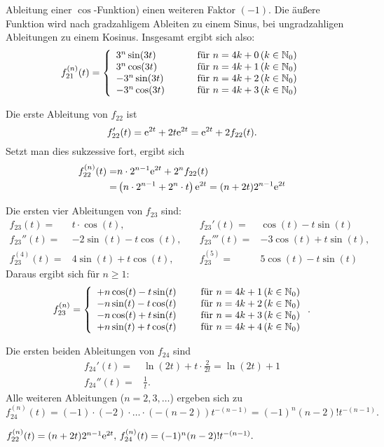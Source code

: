 {\begin{iii}
Ableitung einer $\cos$-Funktion) einen weiteren Faktor $(-1)$. Die \"außere Funktion wird nach gradzahligem
Ableiten zu einem Sinus, bei ungradzahligen Ableitungen zu einem Kosinus. Insgesamt ergibt sich
also: 
$$f_{21}^{(n)}(t)=\left\{\begin{array}{lll}
3^n \sin(3t)&\quad&\text{ f\"ur } n=4k+0\, (k\in\mathbb{N}_0)\\
3^n \cos(3t)&\quad&\text{ f\"ur } n=4k+1\, (k\in\mathbb{N}_0)\\
-3^n \sin(3t)&\quad&\text{ f\"ur } n=4k+2\, (k\in\mathbb{N}_0)\\
-3^n \cos(3t)&\quad&\text{ f\"ur } n=4k+3\, (k\in\mathbb{N}_0)
\end{array}\right.$$
\item Die erste Ableitung von $f_{22}$ ist
$$f_{22}'(t)=\mathrm{e}^{2t}+2t\mathrm{e}^{2t}=\mathrm{e}^{2t} + 2 f_{22}(t).$$
Setzt man dies sukzessive fort, ergibt sich
\begin{align*}
f_{22}^{(n)}(t)=&n\cdot 2^{n-1} \mathrm{e}^{2t} + 2^n f_{22}(t)\\
=&\left( n\cdot 2^{n-1} + 2^n\cdot t\right)\mathrm{e}^{2t}=(n+2t)2^{n-1}\mathrm{e}^{2t}
\end{align*}
\item Die ersten vier Ableitungen von $f_{23}$ sind: 
\begin{align*}
f_{23}(t)=&
t\cdot \cos(t),\quad&f_{23}'(t)=&\cos(t)-t\sin(t)\\
f_{23}''(t)=&-2\sin(t)-t\cos(t),\quad&f_{23}'''(t)=&-3\cos(t)+t\sin(t),\\
f_{23}^{(4)}(t)=&4\sin(t)+t\cos(t),\quad&f_{23}^{(5)} =& 5\cos(t)-t\sin(t)
\end{align*}
Daraus ergibt sich f\"ur $n\geq 1$:
$$f_{23}^{(n)} = \left\{\begin{array}{lll}
+n\cos(t)-t\sin(t) &\, & \text{ f\"ur } n=4k+1\, (k\in\mathbb{N}_0)\\
-n\sin(t)-t\cos(t) &\, & \text{ f\"ur } n=4k+2\, (k\in\mathbb{N}_0)\\
-n\cos(t)+t\sin(t) &\, & \text{ f\"ur } n=4k+3\, (k\in\mathbb{N}_0)\\
+n\sin(t)+t\cos(t) &\, & \text{ f\"ur } n=4k+4\, (k\in\mathbb{N}_0)
\end{array}\right..
$$
\item Die ersten beiden Ableitungen von $f_{24}$ sind
\begin{align*}
f_{24}'(t)=& \ln (2t) + t\cdot \frac 2{2t} = \ln (2t)+1\\
f_{24}''(t)=& \frac 1 t .
\end{align*}
Alle weiteren Ableitungen ($n=2,3,\hdots$) ergeben sich zu 
$$f_{24}^{(n)}(t)=(-1)\cdot(-2)\cdot \hdots\cdot (-(n-2)) t^{-(n-1)}=(-1)^{n}(n-2)!t^{-(n-1)}.$$
\end{iii}
}

{
$
f_{22}^{(n)}(t) = (n+2t)2^{n-1}\mathrm{e}^{2t} , \, 
f_{24}^{(n)}(t) =  (-1)^{n}(n-2)!t^{-(n-1)}.
$

}

